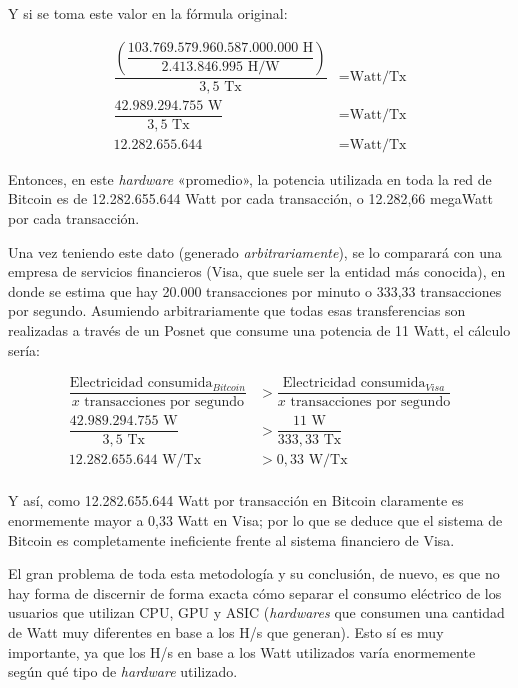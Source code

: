 \documentclass[12pt,a4paper,twoside]{book}
\begin{document}
Y si se toma este valor en la fórmula original:

\begin{align*}
\dfrac{\left( \dfrac{103.769.579.960.587.000.000 \text{ H}}{2.413.846.995 \text{ H/W}} \right)}{3,5 \text{ Tx}} &= \text{Watt/Tx} \\
\dfrac{42.989.294.755 \text{ W}}{3,5 \text{ Tx}} &= \text{Watt/Tx} \\
12.282.655.644 &= \text{Watt/Tx}
\end{align*}

Entonces, en este \textit{hardware} «promedio», la potencia utilizada en toda la red de Bitcoin es de 12.282.655.644 Watt por cada transacción, o 12.282,66 megaWatt por cada transacción.

Una vez teniendo este dato (generado \textit{arbitrariamente}), se lo comparará con una empresa de servicios financieros (Visa, que suele ser la entidad más conocida), en donde se estima que hay 20.000 transacciones por minuto \cite{epedia:visa} o 333,33 transacciones por segundo. Asumiendo arbitrariamente que todas esas transferencias son realizadas a través de un Posnet que consume una potencia de 11 Watt, el cálculo sería:

\begin{align*}
\dfrac{\text{Electricidad consumida}_{Bitcoin}}{x \text{ transacciones por segundo}} &> \dfrac{\text{Electricidad consumida}_{Visa}}{x \text{ transacciones por segundo}} \\
\dfrac{42.989.294.755 \text{ W}}{3,5 \text{ Tx}} &> \dfrac{11 \text{ W}}{333,33 \text{ Tx}} \\
12.282.655.644 \text{ W/Tx} &> 0,33 \text{ W/Tx} \\
\end{align*}

Y así, como 12.282.655.644 Watt por transacción en Bitcoin claramente es enormemente mayor a 0,33 Watt en Visa; por lo que se deduce que el sistema de Bitcoin es completamente ineficiente frente al sistema financiero de Visa.

El gran problema de toda esta metodología y su conclusión, de nuevo, es que no hay forma de discernir de forma exacta cómo separar el consumo eléctrico de los usuarios que utilizan CPU, GPU y ASIC (\textit{hardwares} que consumen una cantidad de Watt muy diferentes en base a los H/s que generan). Esto sí es muy importante, ya que los H/s en base a los Watt utilizados varía enormemente según qué tipo de \textit{hardware} utilizado.
\end{document}

